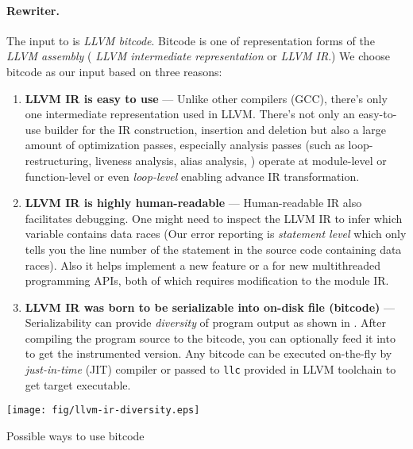 \paragraph{Rewriter.}
The input to \ThreadTracer{} is \textit{LLVM bitcode}. Bitcode is one of representation forms of the \textit{LLVM assembly} (\ie{} \textit{LLVM intermediate representation} or \textit{LLVM IR}.) We choose bitcode as our input based on three reasons:
\begin{enumerate}
	\item \textbf{LLVM IR is easy to use} --- Unlike other compilers (\eg GCC), there's only one intermediate representation used in LLVM. There's not only an easy-to-use builder for the IR construction, insertion and deletion  but also a large amount of optimization passes, especially analysis passes (such as loop-restructuring, liveness analysis, alias analysis, \etc) operate at module-level or function-level or even \textit{loop-level} enabling advance IR transformation.
	\item \textbf{LLVM IR is highly human-readable} --- Human-readable IR also facilitates debugging. One might need to inspect the LLVM IR to infer which variable contains data races (Our error reporting is \textit{statement level} which only tells you the line number of the statement in the source code containing data races). Also it helps implement a new feature or a \Rewriter{} for new multithreaded programming APIs, both of which requires modification to the module IR.
	\item \textbf{LLVM IR was born to be serializable into on-disk file (bitcode)} --- Serializability can provide \textit{diversity} of program output as shown in . After compiling the program source to the bitcode, you can optionally feed it into \ThreadTracer{} to get the instrumented version. Any bitcode can be executed on-the-fly by \textit{just-in-time} (JIT) compiler or passed to \verb|llc| provided in LLVM toolchain to get target executable.
\end{enumerate}

\begin{center-figure}
	\texttt{[image: fig/llvm-ir-diversity.eps]}
	\caption{Possible ways to use bitcode}
	\label{fig:LLVM_IR_diversity}
\end{center-figure}

